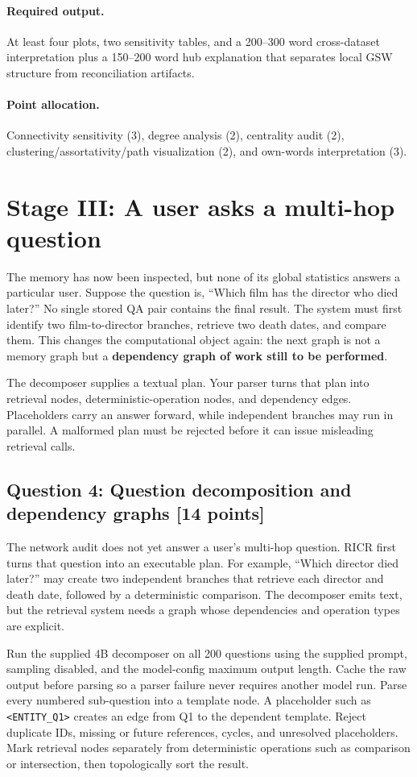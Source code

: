 \documentclass[11pt]{article}
\newcommand{\code}[1]{\texttt{#1}}
\newcommand{\RICR}{{\mdseries\textsc{RICR}}\xspace}
\newcommand{\question}[3]{%
  \subsection[Question #1: #2 (#3 points)]{Question #1: #2 \hfill [#3 points]}%
}
\newcommand{\deliverables}{\paragraph{Required output.}}
\newcommand{\grading}{\paragraph{Point allocation.}}
\begin{document}
\deliverables At least four plots, two sensitivity tables, and a 200--300 word
cross-dataset interpretation plus a 150--200 word hub explanation that
separates local GSW structure from
reconciliation artifacts.

\grading Connectivity sensitivity (3), degree analysis (2), centrality audit
(2), clustering/assortativity/path visualization (2), and own-words
interpretation (3).

\section{Stage III: A user asks a multi-hop question}

The memory has now been inspected, but none of its global statistics answers a
particular user. Suppose the question is, ``Which film has the director who
died later?'' No single stored QA pair contains the final result. The system
must first identify two film-to-director branches, retrieve two death dates,
and compare them. This changes the computational object again: the next graph
is not a memory graph but a \textbf{dependency graph of work still to be
performed}.

The decomposer supplies a textual plan. Your parser turns that plan into
retrieval nodes, deterministic-operation nodes, and dependency edges.
Placeholders carry an answer forward, while independent branches may run in
parallel. A malformed plan must be rejected before it can issue misleading
retrieval calls.

\question{4}{Question decomposition and dependency graphs}{14}

The network audit does not yet answer a user's multi-hop question. \RICR first
turns that question into an executable plan. For example, ``Which director
died later?'' may create two independent branches that retrieve each director
and death date, followed by a deterministic comparison. The decomposer emits
text, but the retrieval system needs a graph whose dependencies and operation
types are explicit.

Run the supplied 4B decomposer on all 200 questions using the supplied prompt,
sampling disabled, and the model-config maximum output length. Cache the raw
output before parsing so a parser failure never requires another model run.
Parse every numbered sub-question into a template node. A placeholder such as
\code{<ENTITY\_Q1>} creates an edge from Q1 to the dependent template. Reject
duplicate IDs, missing or future references, cycles, and unresolved
placeholders. Mark retrieval nodes separately from deterministic operations
such as comparison or intersection, then topologically sort the result.
\end{document}
